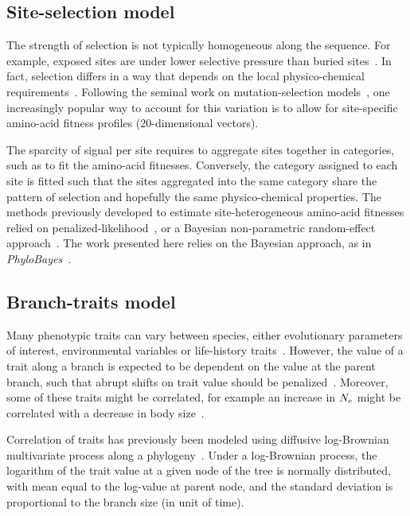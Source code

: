 \subsection{Site-selection model}
\label{sec:SiteHetero}
The strength of selection is not typically homogeneous along the sequence.
For example, exposed sites are under lower selective pressure than buried sites~\citep{Echave2016}.
In fact, selection differs in a way that depends on the local physico-chemical requirements~\citep{Goldstein2016,Goldstein2017,Weber2019}.
Following the seminal work on mutation-selection models~\citep{Halpern1998}, one increasingly popular way to account for this variation is to allow for site-specific amino-acid fitness profiles (20-dimensional vectors).

The sparcity of signal per site requires to aggregate sites together in categories, such as to fit the amino-acid fitnesses.
Conversely, the category assigned to each site is fitted such that the sites aggregated into the same category share the pattern of selection and hopefully the same physico-chemical properties.
The methods previously developed to estimate site-heterogeneous amino-acid fitnesses relied on penalized-likelihood~\citep{Tamuri2012,Tamuri2014}, or a Bayesian non-parametric random-effect approach~\citep{Rodrigue2010,Rodrigue2014,Rodrigue2016}.
The work presented here relies on the Bayesian approach, as in \textit{PhyloBayes}~\citep{Rodrigue2010}.

\subsection{Branch-traits model}
\label{sec:BranchHetero}
Many phenotypic traits can vary between species, either evolutionary parameters of interest, environmental variables or life-history traits~\citep{Felsenstein1985,Romiguier2014}.
However, the value of a trait along a branch is expected to be dependent on the value at the parent branch, such that abrupt shifts on trait value should be penalized~\citep{Huelsenbeck2003,Seo2004}.
Moreover, some of these traits might be correlated, for example an increase in $N_{\mathrm{e}}$ might be correlated with a decrease in body size~\citep{Weber2014,Romiguier2014}.

Correlation of traits has previously been modeled using diffusive log-Brownian multivariate process along a phylogeny~\citep{Seo2004,Lartillot2011}.
Under a log-Brownian process, the logarithm of the trait value at a given node of the tree is normally distributed, with mean equal to the log-value at parent node, and the standard deviation is proportional to the branch size (in unit of time).

